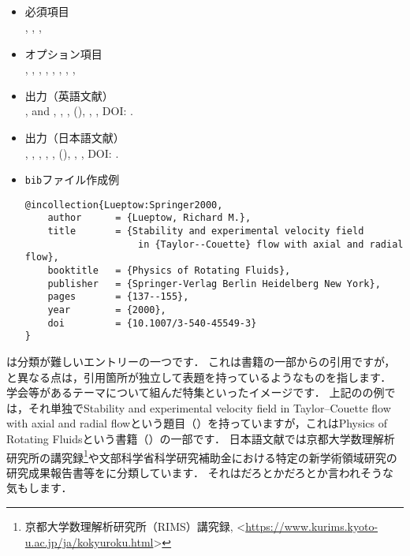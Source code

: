 \documentclass[a4paper,fleqn,uplatex,dvipdfmx]{jsarticle}
\begin{document}
\subsection{\ttincollection}
\label{ssec:incollection}
\begin{tcolorbox}[enhanced, title=\ttincollection, drop fuzzy shadow]
    \begin{itemize}
        \item 必須項目 \\
        \ttauthor, \tttitle, \ttbooktitle, \ttyear
        \item オプション項目 \\
        \tteditor, \ttpages, \ttorganization, \ttpublisher, \ttaddress, \ttmonth, \ttnote, \ttkey, \ttdoi
        \item 出力（英語文献） \\
            \colorbox[gray]{0.8}{\ttauthorf}, \colorbox[gray]{0.8}{\ttauthors} and \colorbox[gray]{0.8}{\ttauthort}, \colorbox[gray]{0.8}{\tttitle}, \colorbox[gray]{0.8}{\ttbooktitle}, \colorbox[gray]{0.8}{\ttpublisher} (\colorbox[gray]{0.8}{\ttyear}), \colorbox[gray]{0.8}{\ttpages}, \colorbox[gray]{0.8}{\ttnote}, DOI: \colorbox[gray]{0.8}{\ttdoi}.
        \item 出力（日本語文献） \\
            \colorbox[gray]{0.8}{\ttauthorf}, \colorbox[gray]{0.8}{\ttauthors}, \colorbox[gray]{0.8}{\ttauthort}, \colorbox[gray]{0.8}{\tttitle}, \colorbox[gray]{0.8}{\ttbooktitle}, \colorbox[gray]{0.8}{\ttpublisher} (\colorbox[gray]{0.8}{\ttyear}), \colorbox[gray]{0.8}{\ttpages}, \colorbox[gray]{0.8}{\ttnote}, DOI: \colorbox[gray]{0.8}{\ttdoi}.
        \item \verb|bib|ファイル作成例 \vspace{-3mm}
\begin{verbatim}
@incollection{Lueptow:Springer2000,
    author      = {Lueptow, Richard M.},
    title       = {Stability and experimental velocity field 
                    in {Taylor--Couette} flow with axial and radial flow},
    booktitle   = {Physics of Rotating Fluids},
    publisher   = {Springer-Verlag Berlin Heidelberg New York},
    pages       = {137--155},
    year        = {2000},
    doi         = {10.1007/3-540-45549-3}
}
\end{verbatim}
    \end{itemize}
\end{tcolorbox}

\ttincollection は分類が難しいエントリーの一つです．
これは書籍の一部からの引用ですが，\ttinbook と異なる点は，引用箇所が独立して表題を持っているようなものを指します．
学会等があるテーマについて組んだ特集といったイメージです．
上記の\citet{Lueptow:Springer2000}の例では，それ単独でStability and experimental velocity field in Taylor--Couette flow with axial and radial flowという題目（\tttitle）を持っていますが，これはPhysics of Rotating Fluidsという書籍（\ttbooktitle）の一部です．
日本語文献では京都大学数理解析研究所の講究録\footnote{京都大学数理解析研究所（RIMS）講究録, \textless\url{https://www.kurims.kyoto-u.ac.jp/ja/kokyuroku.html}\textgreater}や文部科学省科学研究補助金における特定の新学術領域研究の研究成果報告書等を\ttincollection に分類しています．
それは\ttinproceedings だろとか\tttechreport だろとか言われそうな気もします．
\end{document}
